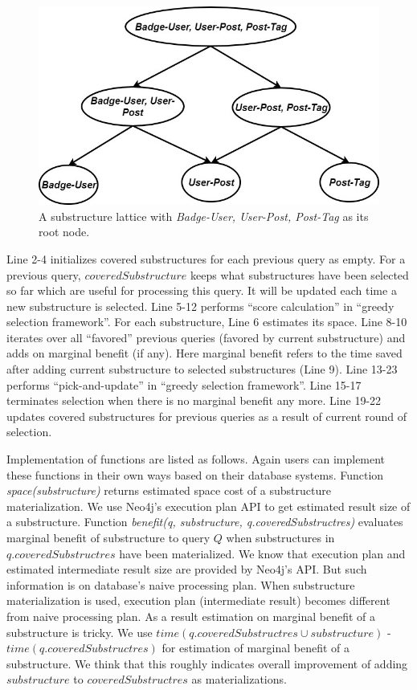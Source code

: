 \begin {figure}[H]
\centering
\includegraphics[scale=0.6]{pic/Structurelattice.jpg}
\caption{A substructure lattice with \textit{Badge-User, User-Post, Post-Tag} as its root node.}
\label{fig:4:3}
\end{figure}


Line 2-4 initializes covered substructures for each previous query as empty. For a previous query, $coveredSubstructure$ keeps what substructures have been selected so far which are useful for processing this query. It will be updated each time a new substructure is selected.
Line 5-12 performs ``score calculation'' in ``greedy selection framework''. For each substructure, Line 6 estimates its space. Line 8-10 iterates over all ``favored'' previous queries (favored by current substructure) and adds on marginal benefit (if any). Here marginal benefit refers to the time saved after adding current substructure to selected substructures (Line 9). Line 13-23 performs ``pick-and-update'' in ``greedy selection framework''. Line 15-17 terminates selection when there is no marginal benefit any more. Line 19-22 updates covered substructures for previous queries as a result of current round of selection.

Implementation of functions are listed as follows. Again users can implement these functions in their own ways based on their database systems. Function \textit{space(substructure)} returns estimated space cost of a substructure materialization. We use Neo4j's execution plan API to get estimated result size of a substructure. Function \textit{benefit(q, substructure, q.coveredSubstructres)} evaluates marginal benefit of substructure to query $Q$ when substructures in $q.coveredSubstructres$ have been materialized. We know that execution plan and estimated intermediate result size are provided by Neo4j's API. But such information is on database's naive processing plan. When substructure materialization is used, execution plan (intermediate result) becomes different from naive processing plan. As a result estimation on marginal benefit of a substructure is tricky. We use $time(q.coveredSubstructres \cup substructure)$ - $time(q.coveredSubstructres)$ for estimation of marginal benefit of a substructure. We think that this roughly indicates overall improvement of adding $substructure$ to $coveredSubstructres$ as materializations.



